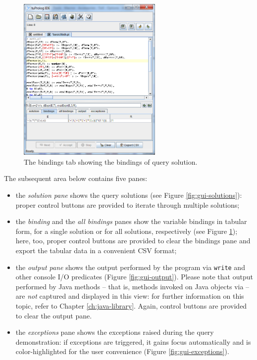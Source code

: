 \begin{figure}
\centering
\includegraphics[width=7cm]{images/gui-bindings}
\caption{The bindings tab showing the bindings of query solution.}
\label{fig:gui-bindings}
\end{figure}

The subsequent area below contains five panes:
%
\begin{itemize}
\item the \textit{solution pane} shows the query solutions (see Figure \ref{fig:gui-solutions}): proper control buttons are provided to iterate 
    through multiple solutions;

\item the \textit{binding} and the \textit{all bindings} panes show the variable bindings in tabular form, for a single solution or for all solutions, respectively (see Figure \ref{fig:gui-bindings}); here, too, proper control buttons are provided to clear the bindings pane and export the tabular data in a convenient CSV format;

\item the \textit{output pane} shows the output performed by the program via \texttt{write} and other console I/O predicates (Figure \ref{fig:gui-output}).
    Please note that output performed by Java methods -- that is, methods invoked on Java objects via  -- are \textit{not} captured and displayed in this view: for further information on this topic, refer to Chapter \ref{ch:java-library}.
    Again, control buttons are provided to clear the output pane.

\item the \textit{exceptions} pane shows the exceptions raised during the query demonstration: if exceptions are triggered, it gains focus automatically and is color-highlighted for the user convenience (Figure \ref{fig:gui-exceptions}).
\end{itemize}

